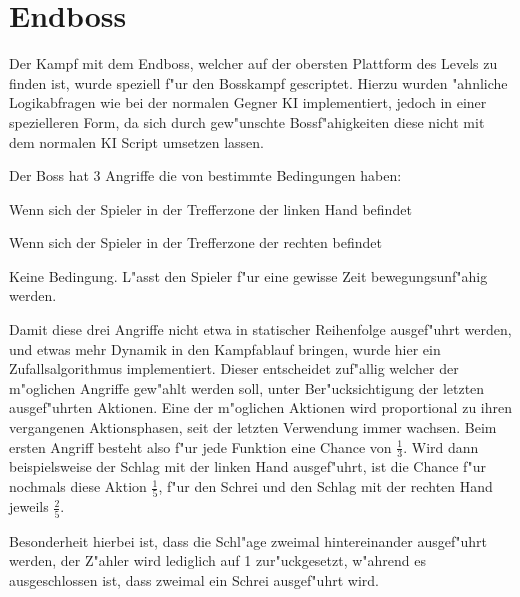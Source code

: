 \chapter{Endboss}
Der Kampf mit dem Endboss, welcher auf der obersten Plattform des Levels zu finden ist, wurde speziell f"ur den Bosskampf gescriptet. Hierzu wurden "ahnliche Logikabfragen wie bei der normalen Gegner KI implementiert, jedoch in einer spezielleren Form, da sich durch gew"unschte Bossf"ahigkeiten diese nicht mit dem normalen KI Script umsetzen lassen.

Der Boss hat 3 Angriffe die von bestimmte Bedingungen haben:
\begin{description}[align=left]
	\item[\textbf{Schlag mit linker Hand}]
	Wenn sich der Spieler in der Trefferzone der linken Hand befindet\newline
	\item[\textbf{Schlag mit rechter Hand}]
	 Wenn sich der Spieler in der Trefferzone der rechten befindet\newline
	\item[\textbf{Schreien}]
	 Keine Bedingung. L"asst den Spieler f"ur eine gewisse Zeit bewegungsunf"ahig werden.
\end{description}

Damit diese drei Angriffe nicht etwa in statischer Reihenfolge ausgef"uhrt werden, und etwas mehr Dynamik in den Kampfablauf bringen, wurde hier ein Zufallsalgorithmus implementiert.
Dieser entscheidet zuf"allig welcher der m"oglichen Angriffe gew"ahlt werden soll, unter Ber"ucksichtigung der letzten ausgef"uhrten Aktionen.
Eine der m"oglichen Aktionen wird proportional zu ihren vergangenen Aktionsphasen, seit der letzten Verwendung immer wachsen.
Beim ersten Angriff besteht also f"ur jede Funktion eine Chance von $\frac{1}{3}$.
Wird dann beispielsweise der Schlag mit der linken Hand ausgef"uhrt, ist die Chance f"ur nochmals diese Aktion $\frac{1}{5}$, f"ur den Schrei und den Schlag mit der rechten Hand jeweils $\frac{2}{5}$.\newline

Besonderheit hierbei ist, dass die Schl"age zweimal hintereinander ausgef"uhrt werden, der Z"ahler wird lediglich auf 1 zur"uckgesetzt, w"ahrend es ausgeschlossen ist, dass zweimal ein Schrei ausgef"uhrt wird.